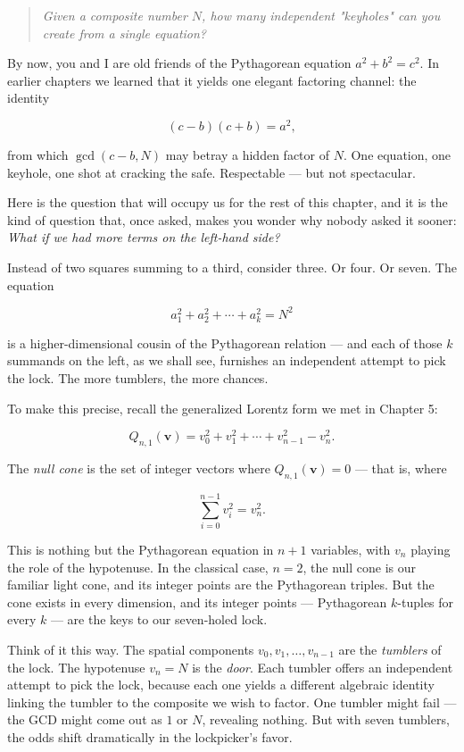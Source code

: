 \begin{quote}
\itshape
\textit{Given a composite number $N$, how many independent "keyholes" can you create from a single equation?}
\end{quote}


By now, you and I are old friends of the Pythagorean equation $a^2 + b^2 = c^2$. In earlier chapters we learned that it yields one elegant factoring channel: the identity

\[(c - b)(c + b) = a^2,\]

from which $\gcd(c - b, N)$ may betray a hidden factor of $N$. One equation, one keyhole, one shot at cracking the safe. Respectable --- but not spectacular.

Here is the question that will occupy us for the rest of this chapter, and it is the kind of question that, once asked, makes you wonder why nobody asked it sooner: \textit{What if we had more terms on the left-hand side?}

Instead of two squares summing to a third, consider three. Or four. Or seven. The equation

\[a_1^2 + a_2^2 + \cdots + a_k^2 = N^2\]

is a higher-dimensional cousin of the Pythagorean relation --- and each of those $k$ summands on the left, as we shall see, furnishes an independent attempt to pick the lock. The more tumblers, the more chances.

To make this precise, recall the generalized Lorentz form we met in Chapter 5:

\[Q_{n,1}(\mathbf{v}) = v_0^2 + v_1^2 + \cdots + v_{n-1}^2 - v_n^2.\]

The \textit{null cone} is the set of integer vectors where $Q_{n,1}(\mathbf{v}) = 0$ --- that is, where

\[\sum_{i=0}^{n-1} v_i^2 = v_n^2.\]

This is nothing but the Pythagorean equation in $n + 1$ variables, with $v_n$ playing the role of the hypotenuse. In the classical case, $n = 2$, the null cone is our familiar light cone, and its integer points are the Pythagorean triples. But the cone exists in every dimension, and its integer points --- Pythagorean $k$-tuples for every $k$ --- are the keys to our seven-holed lock.

Think of it this way. The spatial components $v_0, v_1, \ldots, v_{n-1}$ are the \textit{tumblers} of the lock. The hypotenuse $v_n = N$ is the \textit{door}. Each tumbler offers an independent attempt to pick the lock, because each one yields a different algebraic identity linking the tumbler to the composite we wish to factor. One tumbler might fail --- the GCD might come out as $1$ or $N$, revealing nothing. But with seven tumblers, the odds shift dramatically in the lockpicker's favor.



